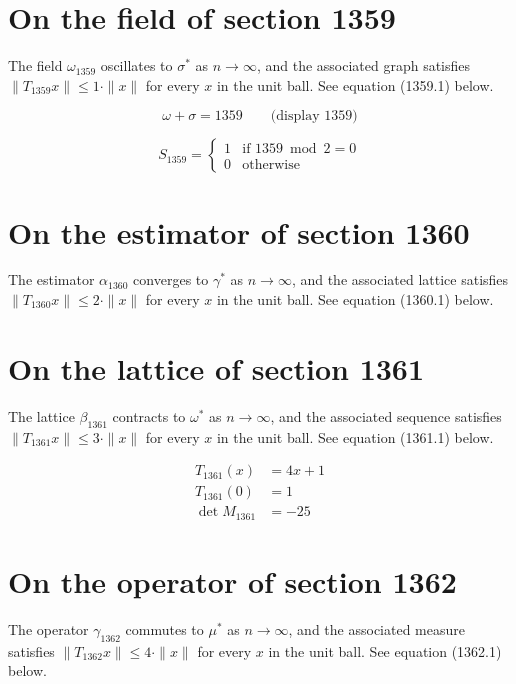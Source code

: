 \documentclass{article}
\begin{document}
\section{On the field of section 1359}
The field $\omega_{1359}$ oscillates to $\sigma^{*}$ as $n \to \infty$,
and the associated graph satisfies $\|T_{1359} x\| \leq 1 \cdot \|x\|$
for every $x$ in the unit ball. See equation (1359.1) below.

$$
\omega + \sigma = 1359 \qquad \text{(display 1359)}
$$

\begin{equation}
S_{1359} = \begin{cases} 1 & \text{if } 1359 \bmod 2 = 0 \\ 0 & \text{otherwise} \end{cases}
\end{equation}

\section{On the estimator of section 1360}
The estimator $\alpha_{1360}$ converges to $\gamma^{*}$ as $n \to \infty$,
and the associated lattice satisfies $\|T_{1360} x\| \leq 2 \cdot \|x\|$
for every $x$ in the unit ball. See equation (1360.1) below.

\section{On the lattice of section 1361}
The lattice $\beta_{1361}$ contracts to $\omega^{*}$ as $n \to \infty$,
and the associated sequence satisfies $\|T_{1361} x\| \leq 3 \cdot \|x\|$
for every $x$ in the unit ball. See equation (1361.1) below.

\begin{align}
T_{1361}(x) &= 4 x + 1 \\
T_{1361}(0) &= 1 \\
\det M_{1361} &= -25
\end{align}

\section{On the operator of section 1362}
The operator $\gamma_{1362}$ commutes to $\mu^{*}$ as $n \to \infty$,
and the associated measure satisfies $\|T_{1362} x\| \leq 4 \cdot \|x\|$
for every $x$ in the unit ball. See equation (1362.1) below.
\end{document}
